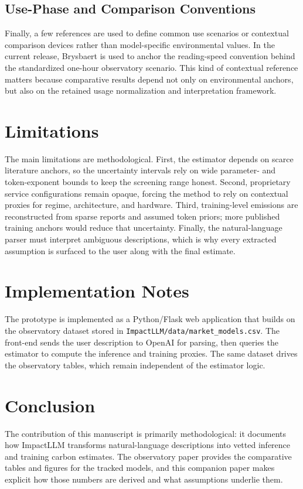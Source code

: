 \documentclass[10pt,a4paper]{article}
\begin{document}
\subsection{Use-Phase and Comparison Conventions}
Finally, a few references are used to define common use scenarios or contextual comparison devices rather than model-specific environmental values. In the current release, Brysbaert \cite{brysbaert2019} is used to anchor the reading-speed convention behind the standardized one-hour observatory scenario. This kind of contextual reference matters because comparative results depend not only on environmental anchors, but also on the retained usage normalization and interpretation framework.

\section{Limitations}
The main limitations are methodological. First, the estimator depends on scarce literature anchors, so the uncertainty intervals rely on wide parameter- and token-exponent bounds to keep the screening range honest. Second, proprietary service configurations remain opaque, forcing the method to rely on contextual proxies for regime, architecture, and hardware. Third, training-level emissions are reconstructed from sparse reports and assumed token priors; more published training anchors would reduce that uncertainty. Finally, the natural-language parser must interpret ambiguous descriptions, which is why every extracted assumption is surfaced to the user along with the final estimate.

\section{Implementation Notes}
The prototype is implemented as a Python/Flask web application that builds on the observatory dataset stored in \texttt{ImpactLLM/data/market\_models.csv}. The front-end sends the user description to OpenAI for parsing, then queries the estimator to compute the inference and training proxies. The same dataset drives the observatory tables, which remain independent of the estimator logic.

\section{Conclusion}
The contribution of this manuscript is primarily methodological: it documents how ImpactLLM transforms natural-language descriptions into vetted inference and training carbon estimates. The observatory paper provides the comparative tables and figures for the tracked models, and this companion paper makes explicit how those numbers are derived and what assumptions underlie them.
\end{document}
